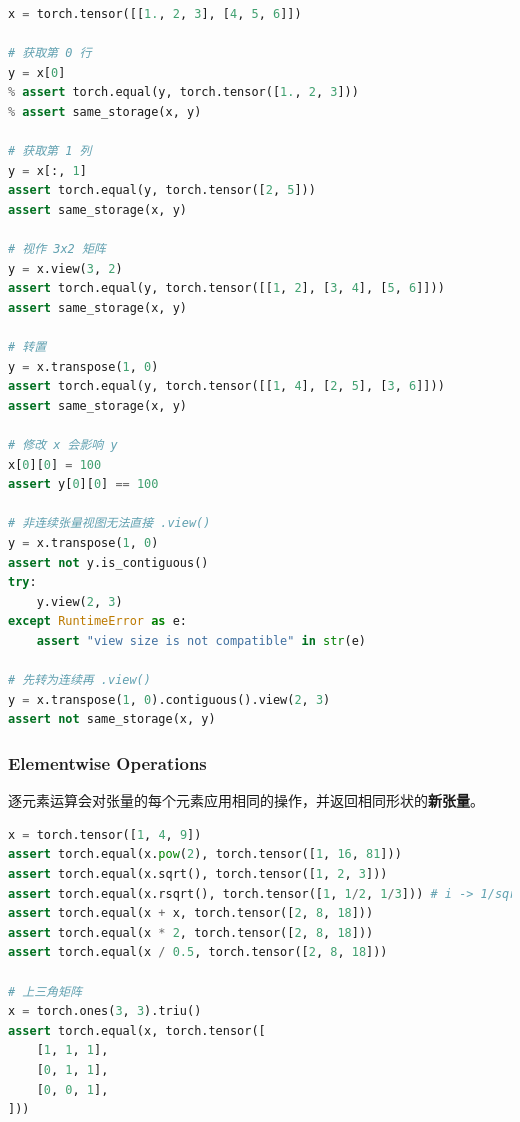 \begin{lstlisting}[language=Python]
x = torch.tensor([[1., 2, 3], [4, 5, 6]])

# 获取第 0 行
y = x[0]
% assert torch.equal(y, torch.tensor([1., 2, 3]))
% assert same_storage(x, y)

# 获取第 1 列
y = x[:, 1]
assert torch.equal(y, torch.tensor([2, 5]))
assert same_storage(x, y)

# 视作 3x2 矩阵
y = x.view(3, 2)
assert torch.equal(y, torch.tensor([[1, 2], [3, 4], [5, 6]]))
assert same_storage(x, y)

# 转置
y = x.transpose(1, 0)
assert torch.equal(y, torch.tensor([[1, 4], [2, 5], [3, 6]]))
assert same_storage(x, y)

# 修改 x 会影响 y
x[0][0] = 100
assert y[0][0] == 100

# 非连续张量视图无法直接 .view()
y = x.transpose(1, 0)
assert not y.is_contiguous()
try:
    y.view(2, 3)
except RuntimeError as e:
    assert "view size is not compatible" in str(e)

# 先转为连续再 .view()
y = x.transpose(1, 0).contiguous().view(2, 3)
assert not same_storage(x, y)
\end{lstlisting}
\vspace{-1em}



\subsubsection{Elementwise Operations}

逐元素运算会对张量的每个元素应用相同的操作，并返回相同形状的\textbf{新张量}。

\begin{lstlisting}[language=Python]
x = torch.tensor([1, 4, 9])
assert torch.equal(x.pow(2), torch.tensor([1, 16, 81]))
assert torch.equal(x.sqrt(), torch.tensor([1, 2, 3]))
assert torch.equal(x.rsqrt(), torch.tensor([1, 1/2, 1/3])) # i -> 1/sqrt(x_i)
assert torch.equal(x + x, torch.tensor([2, 8, 18]))
assert torch.equal(x * 2, torch.tensor([2, 8, 18]))
assert torch.equal(x / 0.5, torch.tensor([2, 8, 18]))

# 上三角矩阵
x = torch.ones(3, 3).triu()
assert torch.equal(x, torch.tensor([
    [1, 1, 1],
    [0, 1, 1],
    [0, 0, 1],
]))
\end{lstlisting}

